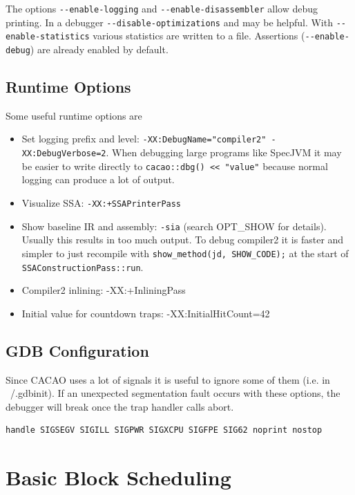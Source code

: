 \documentclass[draft,final]{vutinfth} %
\begin{document}
    The options \lstinline{--enable-logging} and \lstinline{--enable-disassembler} allow debug printing.
    In a debugger \lstinline{--disable-optimizations} and may be helpful.
    With \lstinline{--enable-statistics} various statistics are written to a file.
    Assertions (\lstinline{--enable-debug}) are already enabled by default.

    \subsection{Runtime Options}

    Some useful runtime options are

    \begin{itemize}
        \item Set logging prefix and level: \lstinline{-XX:DebugName="compiler2" -XX:DebugVerbose=2}.
        When debugging large programs like SpecJVM it may be easier to write directly to
        \lstinline{cacao::dbg() << "value"} because normal logging can produce a lot of output.
        \item Visualize SSA: \lstinline{-XX:+SSAPrinterPass}
        \item Show baseline IR and assembly: \lstinline{-sia} (search OPT\_SHOW for details).
        Usually this results in too much output.
        To debug compiler2 it is faster and simpler to just recompile with
        \lstinline{show_method(jd, SHOW_CODE);} at the start of \lstinline{SSAConstructionPass::run}.
        \item Compiler2 inlining: -XX:+InliningPass
        \item Initial value for countdown traps: -XX:InitialHitCount=42
    \end{itemize}

    \subsection{GDB Configuration}

    Since CACAO uses a lot of signals it is useful to ignore some of them (i.e. in ~/.gdbinit).
    If an unexpected segmentation fault occurs with these options,
    the debugger will break once the trap handler calls abort.
    \begin{verbatim}
handle SIGSEGV SIGILL SIGPWR SIGXCPU SIGFPE SIG62 noprint nostop
    \end{verbatim}


    \section{Basic Block Scheduling}
\end{document}
